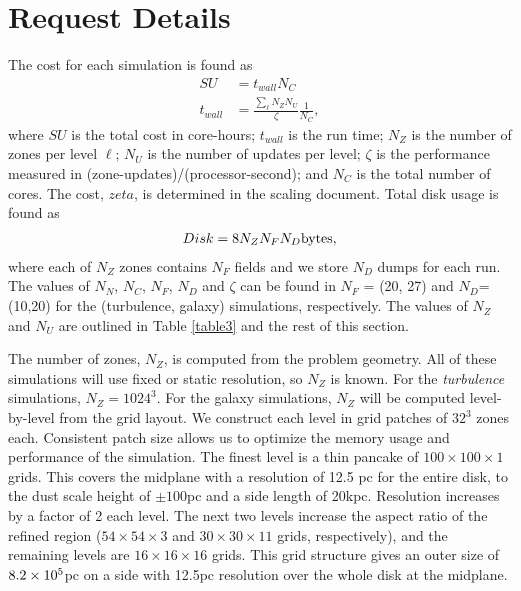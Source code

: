 \section{Request Details}



\label{sec.request}
The cost for each simulation is found as
\begin{align}
SU &= t_{wall} N_C\\
t_{wall} &= \frac{\sum_{\ell} N_Z N_U}{\zeta} \frac{1}{N_C},
\end{align}
where $SU$ is the total cost in core-hours; $t_{wall}$ is the run time; 
 $N_Z$ is the number of zones per level $\ell$; $N_U$ is the number of
updates per level; $\zeta$ is
the performance measured in (zone-updates)/(processor-second); and $N_C$ is the
total number of cores.  The cost, $zeta$, is determined in the scaling document.
Total disk usage is found as
\begin{align}
	Disk = 8 N_Z N_F N_D \rm{bytes},
\end{align}
where each of $N_Z$ zones contains $N_F$ fields and we store $N_D$ dumps for
each run.  The values of $N_N$, $N_C$, $N_F$, $N_D$ and $\zeta$ can be found in
$N_F$ = (20, 27) and $N_D$=(10,20) for the (turbulence, galaxy) simulations,
respectively.   The values of $N_Z$ and $N_U$ are outlined in Table
\ref{table3} and the rest of this section.

The number of zones, $N_Z$, is computed from the problem geometry.  All of these
simulations will use fixed or static resolution, so $N_Z$ is known.  
For the \emph{turbulence} simulations, $N_Z=1024^3$.  For the galaxy
simulations, $N_Z$ will be computed level-by-level from the grid layout.  We construct each level in grid patches of $32^3$ zones each.  
Consistent patch size allows us to optimize the memory usage and performance of the simulation.
The finest level is a thin pancake of
$100\times100\times1$ grids. This covers the midplane with a
resolution of 12.5 pc for 
the entire disk, to the dust scale height of $\pm 100$pc and a side length of
20kpc.
Resolution increases by a factor of 2 each level.  The next two levels increase
the aspect ratio of the refined region ($54\times54\times3$ and
$30\times30\times11$ grids, respectively), and the remaining levels are $16\times 16 \times 16$
grids.   This grid structure gives an outer size of $8.2\times {10^{5}}$pc on a side
with 12.5pc resolution over the whole disk at the midplane.  

